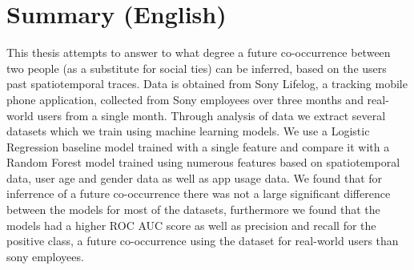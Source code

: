 \chapter{Summary (English)}

This thesis attempts to answer to what degree a future co-occurrence between two people (as a substitute for social ties) can be inferred, based on the users past spatiotemporal traces. 
Data is obtained from Sony Lifelog, a tracking mobile phone application, collected from Sony employees over three months and real-world users from a single month.
Through analysis of data we extract several datasets which we train using machine learning models.
We use a Logistic Regression baseline model trained with a single feature and compare it with a Random Forest model trained using numerous features based on spatiotemporal data, user age and gender data as well as app usage data. We found that for inferrence of a future co-occurrence there was not a large significant difference between the models for most of the datasets, furthermore we found that the models had a higher ROC AUC score as well as precision and recall for the positive class, a future co-occurrence using the dataset for real-world users than sony employees.
